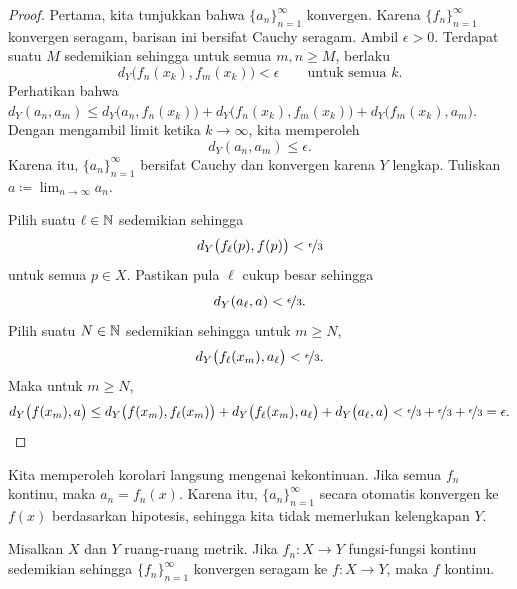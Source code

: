 \begin{proof}
Pertama, kita tunjukkan bahwa $\{ a_n \}_{n=1}^\infty$ konvergen. Karena
$\{ f_n \}_{n=1}^\infty$ konvergen seragam, barisan ini bersifat Cauchy seragam.
Ambil $\epsilon > 0$. Terdapat
suatu $M$ sedemikian sehingga untuk semua $m,n \geq M$, berlaku
\begin{equation*}
d_Y\bigl(f_n(x_k),f_m(x_k)\bigr) < \epsilon \qquad \text{untuk semua } k .
\end{equation*}
Perhatikan bahwa
$d_Y(a_n,a_m) \leq
d_Y\bigl(a_n,f_n(x_k)\bigr) +
d_Y\bigl(f_n(x_k),f_m(x_k)\bigr) +
d_Y\bigl(f_m(x_k),a_m\bigr)$. Dengan mengambil limit ketika $k \to \infty$, kita memperoleh
\begin{equation*}
d_Y(a_n,a_m) \leq \epsilon .
\end{equation*}
Karena itu, $\{a_n\}_{n=1}^\infty$ bersifat Cauchy dan konvergen karena $Y$ lengkap. Tuliskan
$a \coloneqq \lim_{n \to \infty} a_n$.

Pilih suatu $\ell \in {\mathbb{N}}$ sedemikian sehingga
\begin{equation*}
d_Y\bigl(f_\ell(p),f(p)\bigr) < \nicefrac{\epsilon}{3}
\end{equation*}
untuk semua $p \in X$. Pastikan pula $\ell$ cukup besar
sehingga
\begin{equation*}
d_Y(a_\ell,a) < \nicefrac{\epsilon}{3}  .
\end{equation*}
Pilih suatu $N \in {\mathbb{N}}$ sedemikian sehingga untuk $m \geq N$,
\begin{equation*}
d_Y\bigl(f_\ell(x_m),a_\ell\bigr) < \nicefrac{\epsilon}{3}  .
\end{equation*}
Maka untuk
$m \geq N$,
\begin{equation*}
d_Y\bigl(f(x_m),a\bigr)
\leq
d_Y\bigl(f(x_m),f_\ell(x_m)\bigr)
+
d_Y\bigl(f_\ell(x_m),a_\ell\bigr)
+
d_Y\bigl(a_\ell,a\bigr)
<
\nicefrac{\epsilon}{3} +
\nicefrac{\epsilon}{3} +
\nicefrac{\epsilon}{3} = \epsilon . \qedhere
\end{equation*}
\end{proof}

Kita memperoleh korolari langsung mengenai kekontinuan.
Jika semua $f_n$ kontinu, maka $a_n = f_n(x)$.
Karena itu,
$\{ a_n \}_{n=1}^\infty$ secara otomatis konvergen ke
$f(x)$ berdasarkan hipotesis, sehingga kita tidak memerlukan kelengkapan $Y$.

\begin{cor} \label{cor:metricuniformcontinuous}
Misalkan $X$ dan $Y$ ruang-ruang metrik.
Jika $f_n \colon X \to Y$ fungsi-fungsi kontinu
sedemikian sehingga
$\{ f_n \}_{n=1}^\infty$ konvergen seragam ke $f \colon X \to Y$,
maka $f$ kontinu.
\end{cor}

